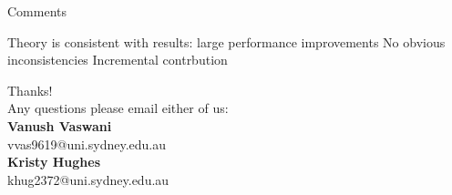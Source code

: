 \documentclass{lecture}
\begin{document}
\begin{plain}{Comments}
\begin{itemize}
\p Theory is consistent with results: large performance improvements
\p No obvious inconsistencies
\p Incremental contrbution
\end{itemize}
\end{plain}


\begin{plain}{}
\begin{center}
\Huge
Thanks!\\
\vspace{3ex}
\Large
Any questions please email either of us:\\
\vspace{2ex}
\large
\textbf{Vanush Vaswani}\\
\normalsize
vvas9619@uni.sydney.edu.au\\
\vspace{1ex}
\large
\textbf{Kristy Hughes}\\
\normalsize
khug2372@uni.sydney.edu.au
\end{center}
\end{plain}
\end{document}
